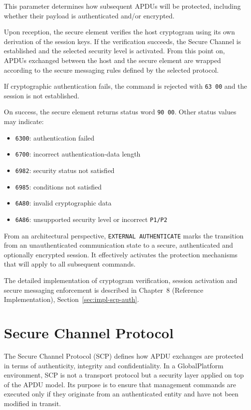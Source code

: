 This parameter determines how subsequent APDUs will be protected, including
whether their payload is authenticated and/or encrypted.

Upon reception, the secure element verifies the host cryptogram using its own
derivation of the session keys. If the verification succeeds, the Secure
Channel is established and the selected security level is activated. From this
point on, APDUs exchanged between the host and the secure element are wrapped according
to the secure messaging rules defined by the selected protocol.

If cryptographic authentication fails, the command is rejected with
\texttt{63 00} and the session is not established.

On success, the secure element returns status word \texttt{90 00}. Other status values
may indicate:
\begin{itemize}
\item \texttt{6300}: authentication failed
\item \texttt{6700}: incorrect authentication-data length
\item \texttt{6982}: security status not satisfied
\item \texttt{6985}: conditions not satisfied
\item \texttt{6A80}: invalid cryptographic data
\item \texttt{6A86}: unsupported security level or incorrect \texttt{P1/P2}
\end{itemize}

From an architectural perspective, \texttt{EXTERNAL AUTHENTICATE} marks the
transition from an unauthenticated communication state to a secure,
authenticated and optionally encrypted session. It effectively activates the
protection mechanisms that will apply to all subsequent commands.

The detailed implementation of cryptogram verification, session activation and
secure messaging enforcement is described in Chapter~8 (Reference
Implementation), Section~\ref{sec:impl-scp-auth}.

\section{Secure Channel Protocol}
\label{sec:protocol-scp}

The Secure Channel Protocol (SCP) defines how APDU exchanges are protected in
terms of authenticity, integrity and confidentiality. In a GlobalPlatform
environment, SCP is not a transport protocol but a security layer applied on
top of the APDU model. Its purpose is to ensure that management commands are
executed only if they originate from an authenticated entity and have not been
modified in transit.

